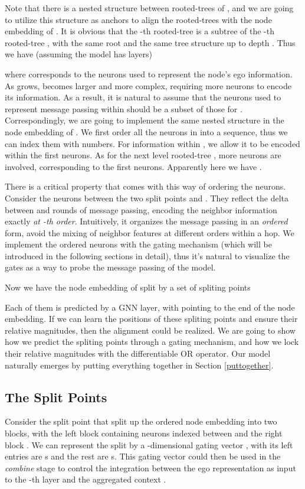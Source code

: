 \documentclass{article}
\begin{document}
Note that there is a nested structure between rooted-trees of , and we are going to utilize this structure as anchors to align the rooted-trees with the node embedding of . It is obvious that the -th rooted-tree  is a subtree of the -th rooted-tree  , with the same root  and the same tree structure up to depth . Thus we have (assuming the model has  layers)

where  corresponds to the neurons used to represent the node's ego information.
As  grows,  becomes larger and more complex, requiring more neurons to encode its information. As a result, it is natural to assume that the neurons used to represent message passing within  should be a subset of those for . Correspondingly, we are going to implement the same nested structure in the node embedding of . We first order all the neurons in  into a sequence, thus we can index them with numbers. For information within , we allow it to be encoded within the first  neurons. As for the next level rooted-tree , more neurons are involved, corresponding to the first  neurons. Apparently here we have .

There is a critical property that comes with this way of ordering the neurons. Consider the neurons between the two split points  and . They reflect the delta between  and  rounds of message passing, encoding the neighbor information exactly \textit{at -th order}. Intuitively, it organizes the message passing in an \textit{ordered} form, avoid the mixing of neighbor features at different orders within a hop. We implement the ordered neurons with the gating mechanism (which will be introduced in the following sections in detail), thus it's natural to visualize the gates as a way to probe the message passing of the model.

Now we have the node embedding of  split by a set of spliting points 

Each of them is predicted by a GNN layer, with  pointing to the end of the node embedding. If we can learn the positions of these spliting points and ensure their relative magnitudes, then the alignment could be realized. We are going to show how we predict the spliting points through a gating mechanism, and how we lock their relative magnitudes with the differentiable OR operator. Our model naturally emerges by putting everything together in Section \ref{puttogether}.


\subsection{The Split Points}
Consider the split point  that split up the ordered node embedding into two blocks, with the left block containing neurons indexed between  and the right block . We can represent the split by a -dimensional gating vector , with its left  entries are s and the rest are s. This gating vector could then be used in the \textit{combine} stage to control the integration between the ego representation as input to the -th layer  and the aggregated context .
\end{document}
